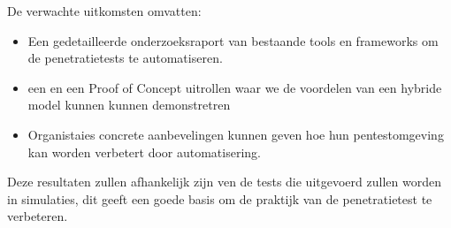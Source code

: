 De verwachte uitkomsten omvatten:
\begin{itemize}
    \item Een gedetailleerde onderzoeksraport van bestaande tools en frameworks om de penetratietests te automatiseren.
    \item een en een Proof of Concept uitrollen waar we de voordelen van een hybride model kunnen kunnen demonstretren
    \item Organistaies concrete aanbevelingen kunnen geven hoe hun pentestomgeving kan worden verbetert door automatisering.
\end{itemize}

Deze resultaten zullen afhankelijk zijn ven de tests die uitgevoerd zullen worden in simulaties, dit geeft een goede basis om 
de praktijk van de penetratietest te verbeteren.